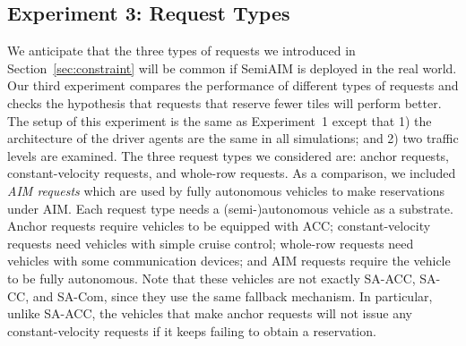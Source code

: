 






\subsection{Experiment 3: Request Types}

We anticipate that the three types of requests we introduced in
Section~\ref{sec:constraint} will be common if SemiAIM is deployed in
the real world.  Our third experiment compares the performance of
different types of requests and checks the hypothesis that requests
that reserve fewer tiles will perform better.  The setup of this
experiment is the same as Experiment~1 except that 1) the architecture
of the driver agents are the same in all simulations; and 2) two
traffic levels are examined.  The three request types we considered
are: anchor requests, constant-velocity requests, and whole-row
requests. As a comparison, we included \emph{AIM requests} which are
used by fully autonomous vehicles to make reservations under AIM. Each
request type needs a (semi-)autonomous vehicle as a substrate.  Anchor
requests require vehicles to be equipped with ACC; constant-velocity
requests need vehicles with simple cruise control; whole-row requests
need vehicles with some communication devices; and AIM requests
require the vehicle to be fully autonomous.  Note that these vehicles
are not exactly SA-ACC, SA-CC, and SA-Com, since they use the same
fallback mechanism.  In particular, unlike SA-ACC, the vehicles that
make anchor requests will not issue any constant-velocity requests if
it keeps failing to obtain a reservation.

